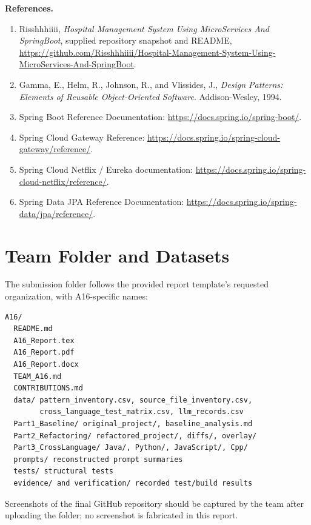 \documentclass[11pt,a4paper]{article}
\begin{document}
\textbf{References.}
\begin{enumerate}
\item Risshhhiiii, \textit{Hospital Management System Using MicroServices And SpringBoot}, supplied repository snapshot and README, \url{https://github.com/Risshhhiiii/Hospital-Management-System-Using-MicroServices-And-SpringBoot}.
\item Gamma, E., Helm, R., Johnson, R., and Vlissides, J., \textit{Design Patterns: Elements of Reusable Object-Oriented Software}. Addison-Wesley, 1994.
\item Spring Boot Reference Documentation: \url{https://docs.spring.io/spring-boot/}.
\item Spring Cloud Gateway Reference: \url{https://docs.spring.io/spring-cloud-gateway/reference/}.
\item Spring Cloud Netflix / Eureka documentation: \url{https://docs.spring.io/spring-cloud-netflix/reference/}.
\item Spring Data JPA Reference Documentation: \url{https://docs.spring.io/spring-data/jpa/reference/}.
\end{enumerate}

\section{Team Folder and Datasets}
The submission folder follows the provided report template's requested organization, with A16-specific names:
\begin{lstlisting}
A16/
  README.md
  A16_Report.tex
  A16_Report.pdf
  A16_Report.docx
  TEAM_A16.md
  CONTRIBUTIONS.md
  data/ pattern_inventory.csv, source_file_inventory.csv,
        cross_language_test_matrix.csv, llm_records.csv
  Part1_Baseline/ original_project/, baseline_analysis.md
  Part2_Refactoring/ refactored_project/, diffs/, overlay/
  Part3_CrossLanguage/ Java/, Python/, JavaScript/, Cpp/
  prompts/ reconstructed prompt summaries
  tests/ structural tests
  evidence/ and verification/ recorded test/build results
\end{lstlisting}
Screenshots of the final GitHub repository should be captured by the team after uploading the folder; no screenshot is fabricated in this report.
\end{document}
